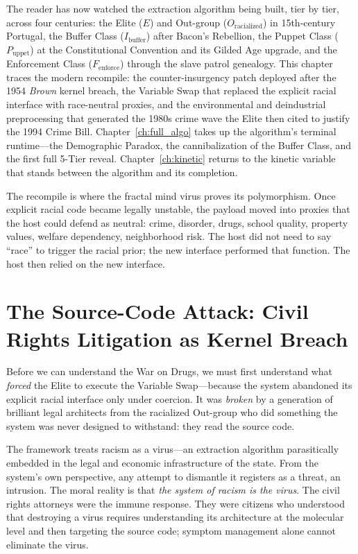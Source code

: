 The reader has now watched the extraction algorithm being built, tier by tier, across four centuries: the Elite ($E$) and Out-group ($O_{\text{racialized}}$) in 15th-century Portugal, the Buffer Class ($I_{\text{buffer}}$) after Bacon's Rebellion, the Puppet Class ($P_{\text{uppet}}$) at the Constitutional Convention and its Gilded Age upgrade, and the Enforcement Class ($F_{\text{enforce}}$) through the slave patrol genealogy. This chapter traces the modern recompile: the counter-insurgency patch deployed after the 1954 \textit{Brown} kernel breach, the Variable Swap that replaced the explicit racial interface with race-neutral proxies, and the environmental and deindustrial preprocessing that generated the 1980s crime wave the Elite then cited to justify the 1994 Crime Bill. Chapter~\ref{ch:full_algo} takes up the algorithm's terminal runtime---the Demographic Paradox, the cannibalization of the Buffer Class, and the first full 5-Tier reveal. Chapter~\ref{ch:kinetic} returns to the kinetic variable that stands between the algorithm and its completion.

The recompile is where the fractal mind virus proves its polymorphism. Once explicit racial code became legally unstable, the payload moved into proxies that the host could defend as neutral: crime, disorder, drugs, school quality, property values, welfare dependency, neighborhood risk. The host did not need to say ``race'' to trigger the racial prior; the new interface performed that function. The host then relied on the new interface.

\section{The Source-Code Attack: Civil Rights Litigation as Kernel Breach}

Before we can understand the War on Drugs, we must first understand what \textit{forced} the Elite to execute the Variable Swap---because the system abandoned its explicit racial interface only under coercion. It was \textit{broken} by a generation of brilliant legal architects from the racialized Out-group who did something the system was never designed to withstand: they read the source code.

The framework treats racism as a virus---an extraction algorithm parasitically embedded in the legal and economic infrastructure of the state. From the system's own perspective, any attempt to dismantle it registers as a threat, an intrusion. The moral reality is that \textit{the system of racism is the virus}. The civil rights attorneys were the immune response. They were citizens who understood that destroying a virus requires understanding its architecture at the molecular level and then targeting the source code; symptom management alone cannot eliminate the virus.


